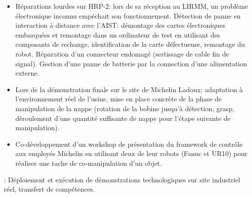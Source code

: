 \begin{cventries}
{\begin{cvitems}
\begin{itemize}
            \item Réparations lourdes sur HRP-2: lors de sa réception au LIRMM, un problème électronique inconnu empéchait son fonctionnement. Détection de panne en interaction à distance avec l'AIST: démontage des cartes électroniques embarquées et remontage dans un ordinateur de test en utilisant des composants de rechange, identification de la carte défectueuse, remontage du robot. Réparation d'un connecteur endomagé (sertissage de cable fin de signal). Gestion d'une panne de batterie par la connection d'une alimentation externe.
            \item Lors de la démonstration finale sur le site de Michelin Ladoux: adaptation à l'environnement réel de l'usine, mise en place concrète de la phase de manipulation de la nappe (rotation de la bobine jusqu'à détection, grasp, déroulement d'une quantité suffisante de nappe pour l'étape suivante de manipulation).
            \item Co-développement d'un workshop de présentation du framework de contrôle aux employés Michelin en utilisant deux de leur robots (Fanuc et UR10) pour réaliser une tache de co-manipulation d'un objet. 
          \end{itemize}
        \item {} : Déploiement et exécution de démonstrations technologiques sur site industriel réel, transfert de compétences.
      \end{cvitems}
    }


\end{cventries}
